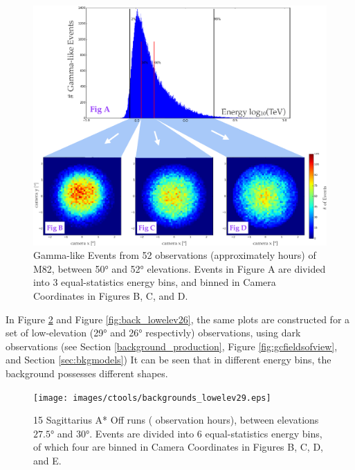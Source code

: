     \begin{figure}[ht]
      \centering
      \includegraphics[width=\textwidth]{images/ctools/backgrounds_highelev.eps}
      \caption[FITS Background at \ang{50} Elevation]{
        Gamma-like Events from 52 observations (approximately  hours) of M82, between \ang{50} and \ang{52} elevations.
        Events in Figure A are divided into 3 equal-statistics energy bins, and binned in Camera Coordinates in Figures B, C, and D.
      }
      \label{fig:back_highelev}
    \end{figure}

    In Figure \ref{fig:back_lowelev29} and Figure \ref{fig:back_lowelev26}, the same plots are constructed for a set of low-elevation (\nicetilde{}\ang{29} and \nicetilde{}\ang{26} respectivly) observations, using dark observations (see Section \ref{background_production}, Figure \ref{fig:gcfieldsofview}, and Section \ref{sec:bkgmodels}) 
    It can be seen that in different energy bins, the background possesses different shapes.

    \begin{figure}[ht]
      \centering
      \texttt{[image: images/ctools/backgrounds\_lowelev29.eps]}
      \caption[CTOOLS Background at \ang{29} Elevation]{
        15 Sagittarius A* Off runs ( observation hours), between elevations $ \ang{27.5} $ and $ \ang{30} $.
        Events are divided into 6 equal-statistics energy bins, of which four are binned in Camera Coordinates in Figures B, C, D, and E.
      }
      \label{fig:back_lowelev29}
    \end{figure}


